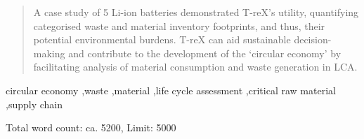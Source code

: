 \documentclass[review,3p,authoryear]{elsarticle}
\newcommand{\cbox}[1]{
    \begin{tcolorbox}[hbox, colback=red!5!white, colframe=red!65!black, boxrule=0.25pt, boxsep=2pt, left=2pt, right=2pt, top=1pt, bottom=1pt]
        \small\sffamily #1
    \end{tcolorbox}
}
\begin{document}
\begin{frontmatter}
\begin{abstract}
        A case study of 5 Li-ion batteries demonstrated T-reX's utility, quantifying categorised waste and material inventory footprints, and thus, their potential environmental burdens. T-reX can aid sustainable decision-making and contribute to the development of the `circular economy' by facilitating analysis of material consumption and waste generation in LCA.

    \end{abstract}


    \begin{keyword}
        circular economy \sep waste \sep material \sep life cycle assessment \sep critical raw material \sep supply chain
    \end{keyword}

\end{frontmatter}
\cbox{Total word count: ca. 5200, Limit: 5000}
\end{document}
